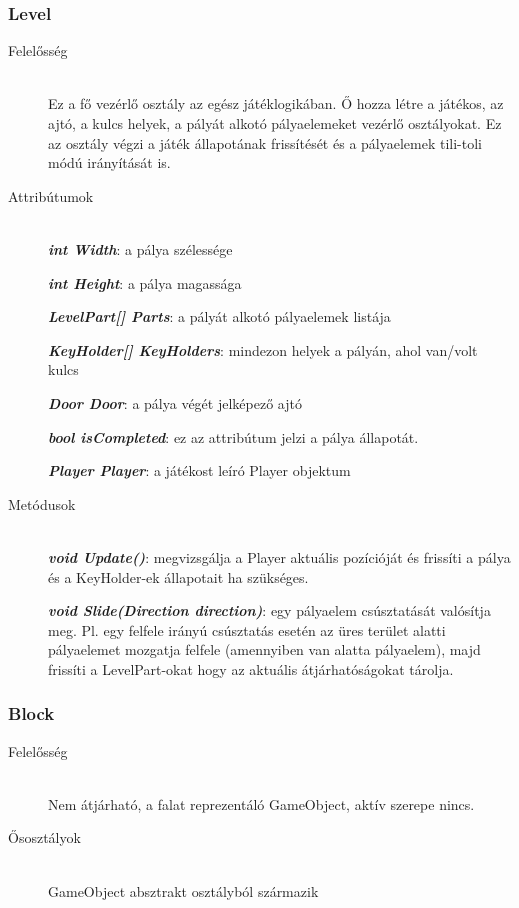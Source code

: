 \subsubsection{Level}
	\begin{description}
		\item[Felelősség] \hfill \\
		Ez a fő vezérlő osztály az egész játéklogikában. Ő hozza létre a játékos, az ajtó, a kulcs helyek, a pályát alkotó pályaelemeket vezérlő osztályokat. Ez az osztály végzi a játék állapotának frissítését és a pályaelemek tili-toli módú irányítását is.
		
		\item[Attribútumok]\hfill \\
		\textbf{\emph{int Width}}: a pálya szélessége
		
		\textbf{\emph{int Height}}: a pálya magassága
		
		\textbf{\emph{LevelPart[] Parts}}: a pályát alkotó pályaelemek listája
		
		\textbf{\emph{KeyHolder[] KeyHolders}}: mindezon helyek a pályán, ahol van/volt kulcs
		
		\textbf{\emph{Door Door}}: a pálya végét jelképező ajtó
		
		\textbf{\emph{bool isCompleted}}: ez az attribútum jelzi a pálya állapotát.
		
		\textbf{\emph{Player Player}}: a játékost leíró Player objektum
		
		\item[Metódusok]\hfill \\
		\textbf{\emph{void Update()}}: megvizsgálja a Player aktuális pozícióját és frissíti a pálya és a KeyHolder-ek állapotait ha szükséges.
		
		\textbf{\emph{void Slide(Direction direction)}}: egy pályaelem csúsztatását valósítja meg. Pl. egy felfele irányú csúsztatás esetén az üres terület alatti pályaelemet mozgatja felfele (amennyiben van alatta pályaelem), majd frissíti a LevelPart-okat hogy az aktuális átjárhatóságokat tárolja.
						
	\end{description}
	
\subsubsection{Block}
	\begin{description}
		\item[Felelősség] \hfill \\
		Nem átjárható, a falat reprezentáló GameObject, aktív szerepe nincs.
		
		\item[Ősosztályok]\hfill \\
		GameObject absztrakt osztályból származik
						
	\end{description}
	
